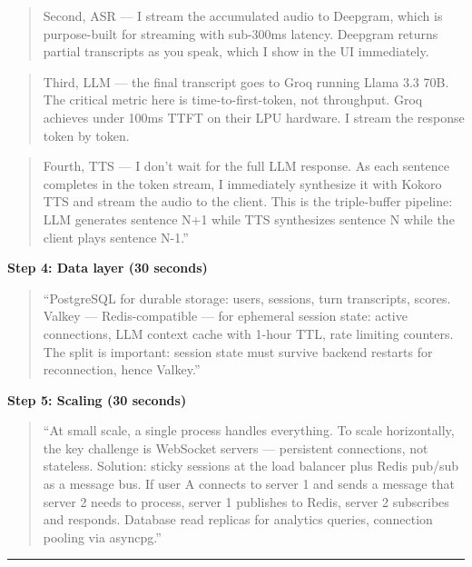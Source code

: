 \documentclass[
  11pt,
]{article}
\begin{document}
\begin{quote}
Second, ASR --- I stream the accumulated audio to Deepgram, which is
purpose-built for streaming with sub-300ms latency. Deepgram returns
partial transcripts as you speak, which I show in the UI immediately.
\end{quote}

\begin{quote}
Third, LLM --- the final transcript goes to Groq running Llama 3.3 70B.
The critical metric here is time-to-first-token, not throughput. Groq
achieves under 100ms TTFT on their LPU hardware. I stream the response
token by token.
\end{quote}

\begin{quote}
Fourth, TTS --- I don't wait for the full LLM response. As each sentence
completes in the token stream, I immediately synthesize it with Kokoro
TTS and stream the audio to the client. This is the triple-buffer
pipeline: LLM generates sentence N+1 while TTS synthesizes sentence N
while the client plays sentence N-1.''
\end{quote}

\textbf{Step 4: Data layer (30 seconds)}

\begin{quote}
``PostgreSQL for durable storage: users, sessions, turn transcripts,
scores. Valkey --- Redis-compatible --- for ephemeral session state:
active connections, LLM context cache with 1-hour TTL, rate limiting
counters. The split is important: session state must survive backend
restarts for reconnection, hence Valkey.''
\end{quote}

\textbf{Step 5: Scaling (30 seconds)}

\begin{quote}
``At small scale, a single process handles everything. To scale
horizontally, the key challenge is WebSocket servers --- persistent
connections, not stateless. Solution: sticky sessions at the load
balancer plus Redis pub/sub as a message bus. If user A connects to
server 1 and sends a message that server 2 needs to process, server 1
publishes to Redis, server 2 subscribes and responds. Database read
replicas for analytics queries, connection pooling via asyncpg.''
\end{quote}

\begin{center}\rule{0.5\linewidth}{0.5pt}\end{center}
\end{document}
